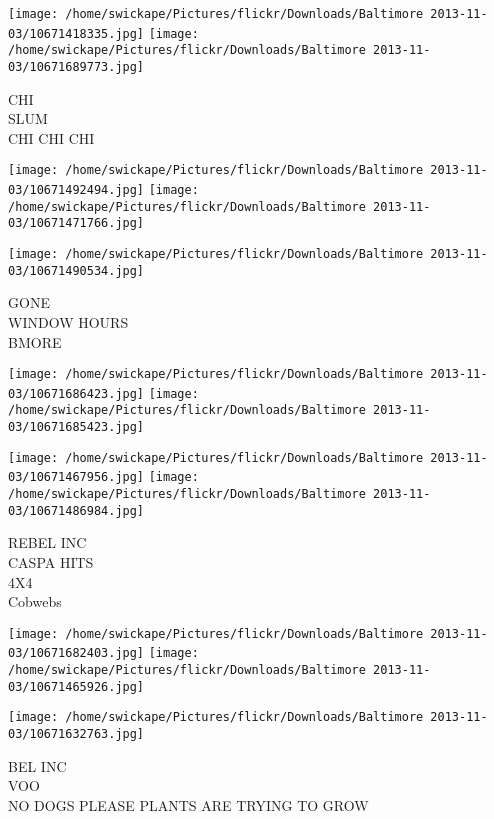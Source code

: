 \documentclass[10pt,letterpaper]{article}
\begin{document}
\vspace{0.25in}
\texttt{[image: /home/swickape/Pictures/flickr/Downloads/Baltimore 2013-11-03/10671418335.jpg]}
\texttt{[image: /home/swickape/Pictures/flickr/Downloads/Baltimore 2013-11-03/10671689773.jpg]}

CHI\\
SLUM\\
CHI CHI CHI\\
\pagebreak

\texttt{[image: /home/swickape/Pictures/flickr/Downloads/Baltimore 2013-11-03/10671492494.jpg]}
\texttt{[image: /home/swickape/Pictures/flickr/Downloads/Baltimore 2013-11-03/10671471766.jpg]}

\vspace{0.25in}
\texttt{[image: /home/swickape/Pictures/flickr/Downloads/Baltimore 2013-11-03/10671490534.jpg]}

GONE\\
WINDOW HOURS\\
BMORE\\
\pagebreak

\texttt{[image: /home/swickape/Pictures/flickr/Downloads/Baltimore 2013-11-03/10671686423.jpg]}
\texttt{[image: /home/swickape/Pictures/flickr/Downloads/Baltimore 2013-11-03/10671685423.jpg]}

\texttt{[image: /home/swickape/Pictures/flickr/Downloads/Baltimore 2013-11-03/10671467956.jpg]}
\texttt{[image: /home/swickape/Pictures/flickr/Downloads/Baltimore 2013-11-03/10671486984.jpg]}

REBEL INC\\
CASPA HITS\\
4X4\\
Cobwebs\\
\pagebreak

\texttt{[image: /home/swickape/Pictures/flickr/Downloads/Baltimore 2013-11-03/10671682403.jpg]}
\texttt{[image: /home/swickape/Pictures/flickr/Downloads/Baltimore 2013-11-03/10671465926.jpg]}

\texttt{[image: /home/swickape/Pictures/flickr/Downloads/Baltimore 2013-11-03/10671632763.jpg]}

BEL INC\\
VOO\\
NO DOGS PLEASE PLANTS ARE TRYING TO GROW\\
\pagebreak
\end{document}
